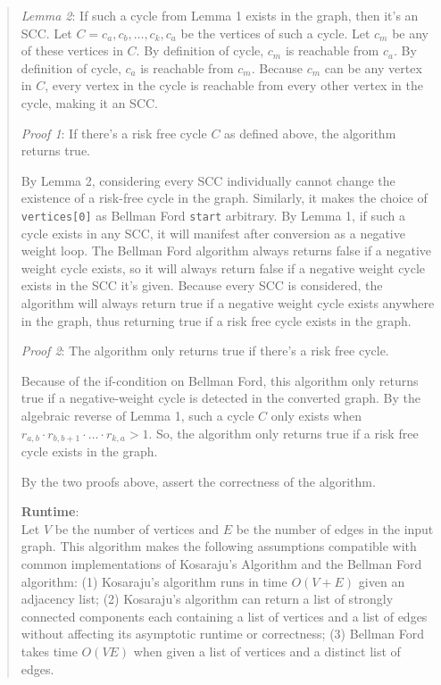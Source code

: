\documentclass[11pt]{article}
\begin{document}
\begin{enumerate}
\begin{quote}
\medskip
\textit{Lemma 2}: If such a cycle from Lemma 1 exists in the graph, then it's an SCC. Let $C = c_a, c_b, \dots, c_k, c_a$ be the vertices of such a cycle. Let $c_m$ be any of these vertices in $C$. By definition of cycle, $c_m$ is reachable from $c_a$. By definition of cycle, $c_a$ is reachable from $c_m$. Because $c_m$ can be any vertex in $C$, every vertex in the cycle is reachable from every other vertex in the cycle, making it an SCC. 

\medskip
\textit{Proof 1}: If there's a risk free cycle $C$ as defined above, the algorithm returns true. 

\medskip
By Lemma 2, considering every SCC individually cannot change the existence of a risk-free cycle in the graph. Similarly, it makes the choice of \texttt{vertices[0]} as Bellman Ford \texttt{start} arbitrary. By Lemma 1, if such a cycle exists in any SCC, it will manifest after conversion as a negative weight loop. The Bellman Ford algorithm always returns false if a negative weight cycle exists, so it will always return false if a negative weight cycle exists in the SCC it's given. Because every SCC is considered, the algorithm will always return true if a negative weight cycle exists anywhere in the graph, thus returning true if a risk free cycle exists in the graph. 

\medskip
\textit{Proof 2}: The algorithm only returns true if there's a risk free cycle. 

\medskip
Because of the if-condition on Bellman Ford, this algorithm only returns true if a negative-weight cycle is detected in the converted graph. By the algebraic reverse of Lemma 1, such a cycle $C$ only exists when $r_{a, b} \cdot r_{b, b + 1} \cdot \dots \cdot r_{k, a} > 1$. So, the algorithm only returns true if a risk free cycle exists in the graph.  

\medskip
By the two proofs above, assert the correctness of the algorithm. 

\medskip
\textbf{Runtime}: \\ 
Let $V$ be the number of vertices and $E$ be the number of edges in the input graph. This algorithm makes the following assumptions compatible with common implementations of Kosaraju's Algorithm and the Bellman Ford algorithm: (1) Kosaraju's algorithm runs in time $O(V + E)$ given an adjacency list; (2) Kosaraju's algorithm can return a list of strongly connected components each containing a list of vertices and a list of edges without affecting its asymptotic runtime or correctness; (3) Bellman Ford takes time $O(VE)$ when given a list of vertices and a distinct list of edges. 


\end{quote}
\end{enumerate}
\end{document}
